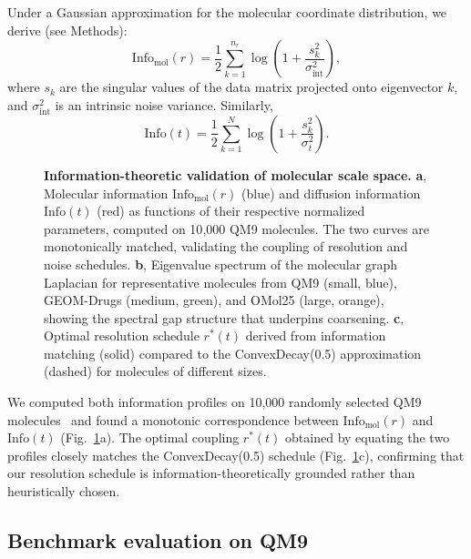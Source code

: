 \documentclass[11pt]{article}
\newcommand{\info}{\mathrm{Info}}
\begin{document}
Under a Gaussian approximation for the molecular coordinate distribution, we derive (see Methods):
\begin{equation}
    \info_{\text{mol}}(r) = \frac{1}{2} \sum_{k=1}^{n_r} \log\!\left(1 + \frac{s_k^2}{\sigma_{\text{int}}^2}\right),
\end{equation}
where $s_k$ are the singular values of the data matrix projected onto eigenvector $k$, and $\sigma_{\text{int}}^2$ is an intrinsic noise variance. Similarly,
\begin{equation}
    \info(t) = \frac{1}{2} \sum_{k=1}^{N} \log\!\left(1 + \frac{s_k^2}{\sigma_t^2}\right).
\end{equation}

\begin{figure}[t]
    \centering
    \caption{\textbf{Information-theoretic validation of molecular scale space.} \textbf{a}, Molecular information $\info_{\text{mol}}(r)$ (blue) and diffusion information $\info(t)$ (red) as functions of their respective normalized parameters, computed on 10{,}000 QM9 molecules. The two curves are monotonically matched, validating the coupling of resolution and noise schedules. \textbf{b}, Eigenvalue spectrum of the molecular graph Laplacian for representative molecules from QM9 (small, blue), GEOM-Drugs (medium, green), and OMol25 (large, orange), showing the spectral gap structure that underpins coarsening. \textbf{c}, Optimal resolution schedule $r^*(t)$ derived from information matching (solid) compared to the ConvexDecay(0.5) approximation (dashed) for molecules of different sizes.}
    \label{fig:information}
\end{figure}

We computed both information profiles on 10{,}000 randomly selected QM9 molecules~\cite{ramakrishnan2014qm9} and found a monotonic correspondence between $\info_{\text{mol}}(r)$ and $\info(t)$ (Fig.~\ref{fig:information}a). The optimal coupling $r^*(t)$ obtained by equating the two profiles closely matches the ConvexDecay(0.5) schedule (Fig.~\ref{fig:information}c), confirming that our resolution schedule is information-theoretically grounded rather than heuristically chosen.


\subsection*{Benchmark evaluation on QM9}
\end{document}
